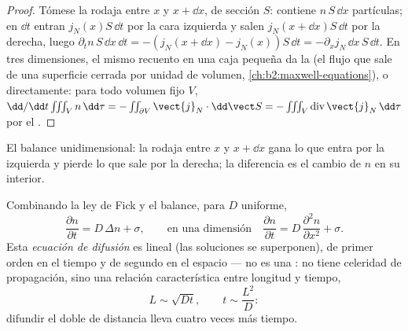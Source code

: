 \begin{proof}
Tómese la rodaja entre $x$ y $x + \dd x$, de sección $S$: contiene
$n\,S\,\dd x$ partículas; en $\dd t$ entran $j_N(x)S\,\dd t$ por la
cara izquierda y salen $j_N(x + \dd x)S\,\dd t$ por la derecha, luego
$\partial_t n\,S\,\dd x\,\dd t = -(j_N(x+\dd x) - j_N(x))S\,\dd t =
-\partial_x j_N\,\dd x\,S\,\dd t$. En tres dimensiones, el mismo recuento en
una caja pequeña da la  (el flujo que sale de una superficie cerrada por
unidad de volumen, \cref{ch:b2:maxwell-equations}), o directamente: para todo
volumen fijo $V$, $\dd/\dd t \iiint_V n\,\dd\tau = -\iint_{\partial V}
\vect{j}_N\cdot\dd\vect S = -\iiint_V \operatorname{div}\vect{j}_N\,\dd\tau$
por el .
\end{proof}

\begin{omfigure}

{\small El balance unidimensional: la rodaja entre $x$ y $x + \dd
x$ gana lo que entra por la izquierda y pierde lo que sale por la derecha;
la diferencia es el cambio de $n$ en su interior.}
\end{omfigure}

\begin{theorem}\label{thm:b2:particle-diffusion:equation}
Combinando la ley de Fick y el balance, para $D$ uniforme,
\[
\frac{\partial n}{\partial t} = D\,\Delta n + \sigma ,
\qquad\text{en una dimensión}\quad
\frac{\partial n}{\partial t} = D\,\frac{\partial^2 n}{\partial x^2} + \sigma .
\]
Esta \emph{ecuación de difusión} es lineal
(las soluciones se superponen), de primer orden en el tiempo y de segundo en el espacio
--- no es una : no tiene celeridad de propagación, sino una
relación característica entre longitud y tiempo,
\[
L \sim \sqrt{D t}, \qquad t \sim \frac{L^2}{D} :
\]
difundir el doble de distancia lleva cuatro veces más tiempo.
\end{theorem}


